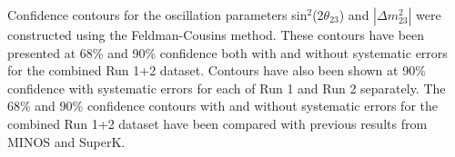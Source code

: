 Confidence contours for the oscillation parameters sin$^{2}$(2$\theta_{23}$) and 
$|\Delta m^{2}_{23}|$ were constructed using the Feldman-Cousins method. These contours have been 
presented at 68\% and 90\% confidence both with and without systematic errors for the combined 
Run 1+2 dataset. Contours have also been shown at 90\% confidence with systematic errors 
for each of Run 1 and Run 2 separately. The 68\% and 90\% confidence contours with and without 
systematic errors for the combined Run 1+2 dataset have been compared with previous results 
from MINOS and SuperK. 




